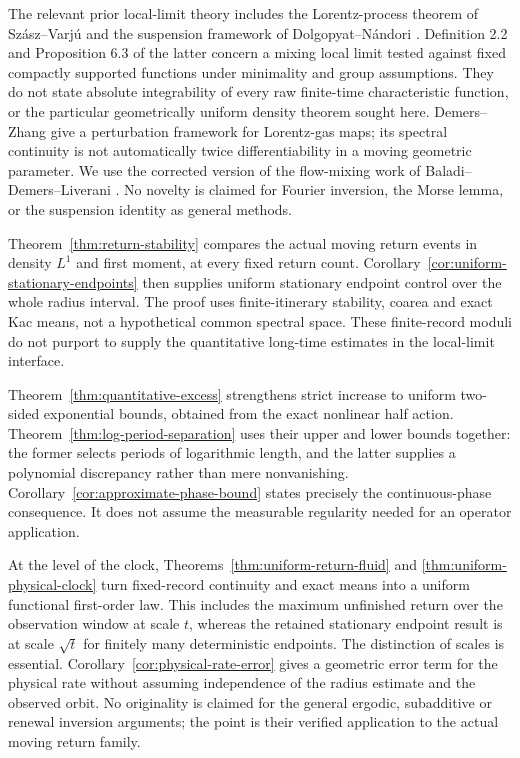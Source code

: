 The relevant prior local-limit theory includes the Lorentz-process theorem of Sz\'asz--Varj\'u \cite{SV} and the suspension framework of Dolgopyat--N\'andori \cite{DN}. Definition 2.2 and Proposition 6.3 of the latter concern a mixing local limit tested against fixed compactly supported functions under minimality and group assumptions. They do not state absolute integrability of every raw finite-time characteristic function, or the particular geometrically uniform density theorem sought here. Demers--Zhang \cite{DZ} give a perturbation framework for Lorentz-gas maps; its spectral continuity is not automatically twice differentiability in a moving geometric parameter. We use the corrected version of the flow-mixing work of Baladi--Demers--Liverani \cite{BDL}. No novelty is claimed for Fourier inversion, the Morse lemma, or the suspension identity as general methods.


Theorem~\ref{thm:return-stability} compares the actual moving return
events in density $L^1$ and first moment, at every fixed return count.
Corollary~\ref{cor:uniform-stationary-endpoints} then supplies uniform
stationary endpoint control over the whole radius interval. The proof uses
finite-itinerary stability, coarea and exact Kac means, not a hypothetical
common spectral space. These finite-record moduli do not purport to supply
the quantitative long-time estimates in the local-limit interface.

Theorem~\ref{thm:quantitative-excess} strengthens strict increase to
uniform two-sided exponential bounds, obtained from the exact nonlinear
half action. Theorem~\ref{thm:log-period-separation} uses their upper and
lower bounds together: the former selects periods of logarithmic length,
and the latter supplies a polynomial discrepancy rather than mere
nonvanishing. Corollary~\ref{cor:approximate-phase-bound} states precisely
the continuous-phase consequence. It does not assume the measurable
regularity needed for an operator application.

At the level of the clock, Theorems~\ref{thm:uniform-return-fluid} and
\ref{thm:uniform-physical-clock} turn fixed-record continuity and exact
means into a uniform functional first-order law. This includes the maximum
unfinished return over the observation window at scale $t$, whereas the
retained stationary endpoint result is at scale $\sqrt t$ for finitely
many deterministic endpoints. The distinction of scales is essential.
Corollary~\ref{cor:physical-rate-error} gives a geometric error term for
the physical rate without assuming independence of the radius estimate
and the observed orbit. No originality is claimed for the general ergodic,
subadditive or renewal inversion arguments; the point is their verified
application to the actual moving return family.
